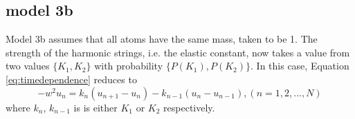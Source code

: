 \subsection{model 3b}
Model 3b assumes that all atoms have the same mass, taken to be 1. The strength of the harmonic strings, i.e. the elastic constant,  now takes a value from two values $\{K_1,K_2\}$ with probability $\{P(K_1),P(K_2)\}$. In this case, Equation \ref{eq:timedependence} reduces to 
\begin{equation}\label{eq:timedependence}
-w^2u_n = k_n(u_{n+1}-u_n) - k_{n-1}(u_n-u_{n-1}), (n = 1,2,...,N)
\end{equation}
where $k_n$, $k_{n-1}$ is is either $K_1$ or $K_2$ respectively. 



\endinput

